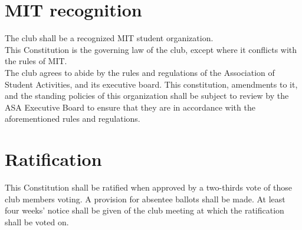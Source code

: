 \documentclass{article}
\begin{document}
\section {MIT recognition}
The club shall be a recognized MIT student organization.\\
This Constitution is the governing law of the club, except where it
conflicts with the rules of MIT.\\
The club agrees to abide by the rules and regulations of the
Association of Student Activities, and its executive board. This
constitution, amendments to it, and the standing policies of this organization
shall be subject to review by the ASA Executive Board to ensure that
they are in accordance with the aforementioned rules and regulations.
\section{Ratification}
This Constitution shall be ratified when approved by a two-thirds vote of
those club members voting.  A provision for absentee ballots shall be made.
At least four weeks' notice shall be given of the club meeting at which
the ratification shall be voted on.\\
\end{document}
